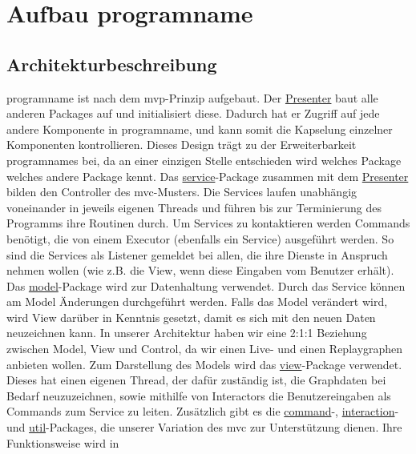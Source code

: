 \chapter{Aufbau \gls{programname}}
\label{ch:aufbau_programname}

\section{Architekturbeschreibung}

\gls{programname} ist nach dem \gls{mvp}-Prinzip aufgebaut. Der
\hyperref[subsec:presenter]{Presenter} baut alle anderen Packages auf und
initialisiert diese. Dadurch hat er Zugriff auf jede andere Komponente in \gls{programname},
und kann somit die Kapselung einzelner Komponenten kontrollieren. Dieses Design
trägt zu der Erweiterbarkeit \gls{programname}s bei, da an einer einzigen
Stelle entschieden wird welches Package welches andere Package kennt.
\newline
\newline
Das \hyperref[subsec:service]{service}-Package zusammen mit dem \hyperref[subsec:presenter]{Presenter}
bilden den Controller des \gls{mvc}-Musters. Die Services laufen unabhängig voneinander in 
jeweils eigenen Threads und führen bis zur Terminierung des Programms ihre Routinen durch. 
Um Services zu kontaktieren werden Commands benötigt, die von einem Executor (ebenfalls ein 
Service) ausgeführt werden. So sind die Services als Listener gemeldet bei allen, die ihre 
Dienste in Anspruch nehmen wollen (wie z.B. die View, wenn diese Eingaben vom Benutzer erhält).
\newline
\newline
Das \hyperref[subsec:model]{model}-Package wird zur Datenhaltung verwendet. Durch das Service 
können am Model Änderungen durchgeführt werden. Falls das Model verändert wird, wird View 
darüber in Kenntnis gesetzt, damit es sich mit den neuen Daten neuzeichnen kann. In unserer 
Architektur haben wir eine 2:1:1 Beziehung zwischen Model, View und Control, da wir einen 
Live- und einen Replaygraphen anbieten wollen.
\newline
\newline
Zum Darstellung des Models wird das \hyperref[subsec:view]{view}-Package verwendet. Dieses 
hat einen eigenen Thread, der dafür zuständig ist, die Graphdaten bei Bedarf neuzuzeichnen, 
sowie mithilfe von Interactors die Benutzereingaben als Commands zum Service zu leiten.
\newline
\newline
Zusätzlich gibt es die \hyperref[subsec:command]{command}-, \hyperref[subsec:interaction]{interaction}- 
und \hyperref[subsec:util]{util}-Packages, die unserer Variation des \gls{mvc} zur Unterstützung dienen.
Ihre Funktionsweise wird in 



